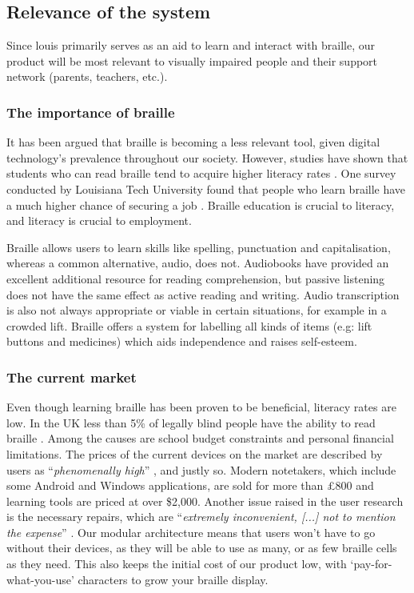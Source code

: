 \documentclass{article}
\begin{document}
\subsection{Relevance of the system} 

Since louis primarily serves as an aid to learn and interact with braille, our product will be most relevant to visually impaired people and their support network (parents, teachers, etc.).

\subsubsection{The importance of braille}

It has been argued that braille is becoming a less relevant tool, given digital technology's prevalence throughout our society. However, studies have shown that students who can read braille tend to acquire higher literacy rates \cite{earlybraille}. One survey conducted by Louisiana Tech University found that people who learn braille have a much higher chance of securing a job \cite{transformingbraille}. Braille education is crucial to literacy, and literacy is crucial to employment.

Braille allows users to learn skills like spelling, punctuation and capitalisation, whereas a common alternative, audio, does not. Audiobooks have provided an excellent additional resource for reading comprehension, but passive listening does not have the same effect as active reading and writing. Audio transcription is also not always appropriate or viable in certain situations, for example in a crowded lift. Braille offers a system for labelling all kinds of items (e.g: lift buttons and medicines) which aids independence and raises self-esteem.

\subsubsection{The current market}

Even though learning braille has been proven to be beneficial, literacy rates are low. In the UK less than 5\% of legally blind people have the ability to read braille \cite{brailleprofiling}. Among the causes are school budget constraints and personal financial limitations. The prices of the current devices on the market are described by users as ``\emph{phenomenally high}'' \cite{brailledisplays}, and justly so. Modern notetakers, which include some Android and Windows applications, are sold for more than \pounds 800 and learning tools are priced at over \$2,000. Another issue raised in the user research is the necessary repairs, which are ``\emph{extremely inconvenient, [...] not to mention the expense}'' \cite{brailledisplays}. Our modular architecture means that users won't have to go without their devices, as they will be able to use as many, or as few braille cells as they need. This also keeps the initial cost of our product low, with `pay-for-what-you-use' characters to grow your braille display.
\end{document}
